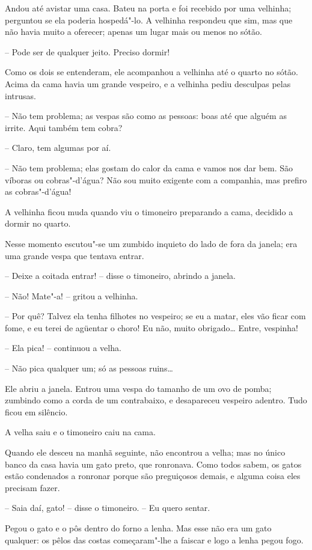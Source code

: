 Andou até avistar uma casa. Bateu na porta e foi recebido por uma
velhinha; perguntou se ela poderia hospedá"-lo. A velhinha respondeu
que sim, mas que não havia muito a oferecer; apenas um lugar mais ou
menos no sótão.

-- Pode ser de qualquer jeito. Preciso dormir!

Como os dois se entenderam, ele acompanhou a velhinha até o quarto no
sótão. Acima da cama havia um grande vespeiro, e a velhinha pediu
desculpas pelas intrusas.

-- Não tem problema; as vespas são como as pessoas: boas até que alguém
as irrite. Aqui também tem cobra?

-- Claro, tem algumas por aí.

-- Não tem problema; elas gostam do calor da cama e vamos nos dar bem.
São víboras ou cobras"-d’água? Não sou muito exigente com a companhia,
mas prefiro as cobras"-d’água!

A velhinha ficou muda quando viu o timoneiro preparando a cama, decidido
a dormir no quarto. 

Nesse momento escutou"-se um zumbido inquieto do lado de fora da
janela; era uma grande vespa que tentava entrar.

-- Deixe a coitada entrar! -- disse o timoneiro, abrindo a janela.

-- Não! Mate"-a! -- gritou a velhinha.

-- Por quê? Talvez ela tenha filhotes no vespeiro; se eu a matar, eles
vão ficar com fome, e eu terei de agüentar o choro! Eu não, muito
obrigado\ldots{} Entre, vespinha!

-- Ela pica! -- continuou a velha.

-- Não pica qualquer um; só as pessoas ruins\ldots{}

Ele abriu a janela. Entrou uma vespa do tamanho de um ovo de pomba;
zumbindo como a corda de um contrabaixo, e desapareceu vespeiro
adentro. Tudo ficou em silêncio. 

A velha saiu e o timoneiro caiu na cama. 

Quando ele desceu na manhã seguinte, não encontrou a velha; mas no único
banco da casa havia um gato preto, que ronronava. Como todos sabem, os
gatos estão condenados a ronronar porque são preguiçosos demais, e
alguma coisa eles precisam fazer.

-- Saia daí, gato! -- disse o timoneiro. -- Eu quero sentar.

Pegou o gato e o pôs dentro do forno a lenha. Mas esse não era um gato
qualquer: os pêlos das costas começaram"-lhe a faiscar e logo a lenha
pegou fogo.


